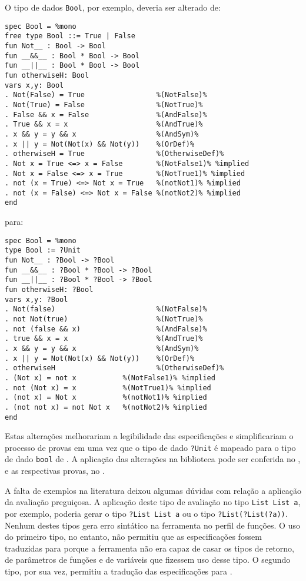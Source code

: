O tipo de dados \Verb.Bool., por exemplo, deveria ser alterado de:

\begin{Verbatim}
spec Bool = %mono
free type Bool ::= True | False 
fun Not__ : Bool -> Bool
fun __&&__ : Bool * Bool -> Bool
fun __||__ : Bool * Bool -> Bool
fun otherwiseH: Bool      
vars x,y: Bool
. Not(False) = True                 %(NotFalse)%
. Not(True) = False                 %(NotTrue)%
. False && x = False                %(AndFalse)%
. True && x = x                     %(AndTrue)%
. x && y = y && x                   %(AndSym)%
. x || y = Not(Not(x) && Not(y))    %(OrDef)%
. otherwiseH = True                 %(OtherwiseDef)%
. Not x = True <=> x = False        %(NotFalse1)% %implied
. Not x = False <=> x = True        %(NotTrue1)% %implied
. not (x = True) <=> Not x = True   %(notNot1)% %implied
. not (x = False) <=> Not x = False %(notNot2)% %implied
end
\end{Verbatim}

para:

\begin{Verbatim}
spec Bool = %mono
type Bool := ?Unit 
fun Not__ : ?Bool -> ?Bool
fun __&&__ : ?Bool * ?Bool -> ?Bool
fun __||__ : ?Bool * ?Bool -> ?Bool
fun otherwiseH: ?Bool      
vars x,y: ?Bool
. Not(false)                        %(NotFalse)%
. not Not(true)                     %(NotTrue)%
. not (false && x)                  %(AndFalse)%
. true && x = x                     %(AndTrue)%
. x && y = y && x                   %(AndSym)%
. x || y = Not(Not(x) && Not(y))    %(OrDef)%
. otherwiseH                        %(OtherwiseDef)%
. (Not x) = not x           %(NotFalse1)% %implied
. not (Not x) = x           %(NotTrue1)% %implied
. (not x) = Not x           %(notNot1)% %implied
. (not not x) = not Not x   %(notNot2)% %implied
end
\end{Verbatim}

Estas alterações melhorariam a legibilidade das especificações e simplificariam o processo de provas em \Isabelle uma vez que o tipo de dado \Verb.?Unit. é mapeado para o tipo de dado \Verb.bool. de \HOL.
A aplicação das alterações na biblioteca pode ser conferida no , e as respectivas provas, no .

A falta de exemplos na literatura deixou algumas dúvidas com relação a aplicação da avaliação preguiçosa.
A aplicação deste tipo de avaliação no tipo \Verb.List List a., por exemplo, poderia gerar o tipo \Verb.?List List a. ou o tipo \Verb.?List(?List(?a))..
Nenhum destes tipos gera erro sintático na ferramenta \Hets no perfil de funções.
O uso do primeiro tipo, no entanto, não permitiu que as especificações fossem traduzidas para \HOL porque a ferramenta \Hets não era capaz de casar os tipos de retorno, de parâmetros de funções e de variáveis que fizessem uso desse tipo.
O segundo tipo, por sua vez, permitiu a tradução das especificações para \HOL.

